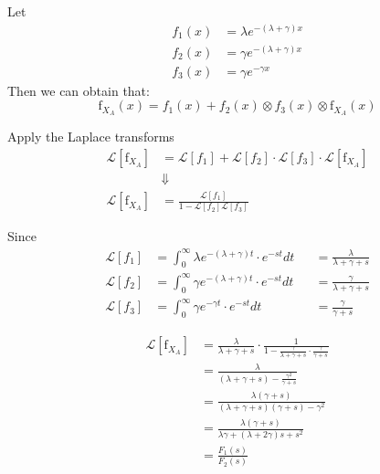 \documentclass[UTF8]{article}
\begin{document}
\begin{enumerate}[a)]
        Let
        \begin{equation*}
            \begin{aligned}
                f_1(x)&=\lambda e^{-(\lambda+\gamma)x}\\
                f_2(x)&=\gamma e^{-(\lambda+\gamma)x}\\
                f_3(x)&=\gamma e^{-\gamma x}
            \end{aligned}
        \end{equation*}
        Then we can obtain that:
        \begin{equation*}
            \text{f}_{X_A}(x)=f_1(x)+f_2(x)\otimes f_3(x)\otimes\text{f}_{X_A}(x)
        \end{equation*}

        Apply the Laplace transforms
        \begin{equation*}
            \begin{aligned}
                \mathcal{L}[\text{f}_{X_A}]&=\mathcal{L}[f_1]+\mathcal{L}[f_2]\cdot\mathcal{L}[f_3]\cdot\mathcal{L}[\text{f}_{X_A}]\\
                &\Downarrow\\
                \mathcal{L}[\text{f}_{X_A}]&=\frac{\mathcal{L}[f_1]}{1-\mathcal{L}[f_2]\mathcal{L}[f_3]}
            \end{aligned}
        \end{equation*}

        Since
        \begin{equation*}
            \begin{aligned}
                \mathcal{L}[f_1]&=\int^\infty_0\lambda e^{-(\lambda+\gamma)t}\cdot e^{-st}dt&&=\frac{\lambda}{\lambda+\gamma+s}\\
                \mathcal{L}[f_2]&=\int^\infty_0\gamma e^{-(\lambda+\gamma)t}\cdot e^{-st}dt&&=\frac{\gamma}{\lambda+\gamma+s}\\
                \mathcal{L}[f_3]&=\int^\infty_0\gamma e^{-\gamma t}\cdot e^{-st}dt&&=\frac{\gamma}{\gamma+s}
            \end{aligned}
        \end{equation*}

        \begin{equation*}
            \begin{aligned}
                \mathcal{L}[\text{f}_{X_A}]&=\frac{\lambda}{\lambda+\gamma+s}\cdot\frac{1}{1-\frac{\gamma}{\lambda+\gamma+s}\cdot\frac{\gamma}{\gamma+s}}\\
                &=\frac{\lambda}{(\lambda+\gamma+s)-\frac{\gamma^2}{\gamma+s}}\\
                &=\frac{\lambda(\gamma+s)}{(\lambda+\gamma+s)(\gamma+s)-\gamma^2}\\
                &=\frac{\lambda(\gamma+s)}{\lambda\gamma+(\lambda+2\gamma)s+s^2}\\
                &=\frac{F_1(s)}{F_2(s)}
            \end{aligned}
        \end{equation*}


\end{enumerate}
\end{document}
